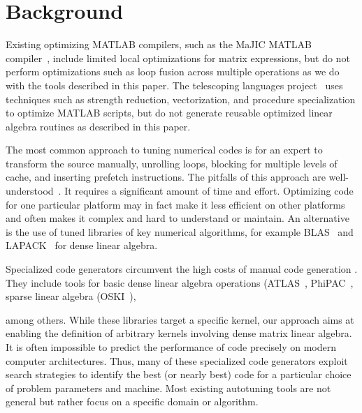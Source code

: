 \documentclass[runningheads]{llncs}
\begin{document}
\section{Background}
\label{sec:background}

Existing optimizing MATLAB compilers, such as the MaJIC MATLAB compiler~\cite{MaJIC},
include limited local optimizations for matrix expressions, but do not
perform optimizations such as loop fusion across multiple operations as we do
with the tools described in this paper. The telescoping languages
project~\cite{telescopingurl} uses techniques such as
strength reduction, vectorization, and procedure specialization to optimize
MATLAB scripts, but do not generate reusable optimized linear algebra
routines as described in this paper.

The most common approach to tuning numerical codes is for an expert to
transform the source manually, unrolling loops, blocking for multiple levels
of cache, and inserting prefetch instructions.  The pitfalls of this approach
are well-understood~\cite{Goedecker01}.  It requires a significant amount of
time and effort. Optimizing code for one particular platform may in fact make
it less efficient on other platforms and often makes it complex and hard to
understand or maintain.  An alternative is the use of tuned libraries of key
numerical algorithms, for example BLAS~\cite{Dongarra:1990fk} and
LAPACK~\cite{LAPACK} for dense linear algebra.

Specialized code generators circumvent the high costs of manual code
generation . They include tools for basic dense linear algebra operations
(ATLAS~\cite{WN147}, PhiPAC~\cite{bilmes97optimizing},
sparse linear algebra (OSKI~\cite{vuduc05}), 

among others.  While these libraries target a specific kernel, our approach aims 
at enabling the definition of arbitrary kernels involving dense matrix linear algebra.
It is often impossible to predict the performance of code precisely
on modern computer architectures. Thus, many of these specialized code
generators exploit search strategies to identify the best (or nearly best)
code for a particular choice of problem parameters and machine. Most existing
autotuning tools are not general but rather focus on a specific domain or algorithm.
\end{document}

